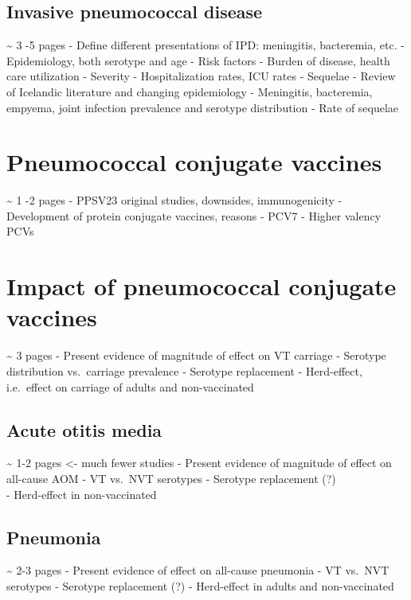 \documentclass[]{book}
\theoremstyle{definition}
\theoremstyle{definition}
\theoremstyle{definition}
\theoremstyle{remark}
\begin{document}
\subsection{Invasive pneumococcal
disease}\label{invasive-pneumococcal-disease}

\textasciitilde{} 3 -5 pages - Define different presentations of IPD:
meningitis, bacteremia, etc. - Epidemiology, both serotype and age -
Risk factors - Burden of disease, health care utilization - Severity -
Hospitalization rates, ICU rates - Sequelae - Review of Icelandic
literature and changing epidemiology - Meningitis, bacteremia, empyema,
joint infection prevalence and serotype distribution - Rate of sequelae

\section{Pneumococcal conjugate
vaccines}\label{pneumococcal-conjugate-vaccines}

\textasciitilde{} 1 -2 pages - PPSV23 original studies, downsides,
immunogenicity - Development of protein conjugate vaccines, reasons -
PCV7 - Higher valency PCVs

\section{Impact of pneumococcal conjugate
vaccines}\label{impact-of-pneumococcal-conjugate-vaccines}

\textasciitilde{} 3 pages - Present evidence of magnitude of effect on
VT carriage - Serotype distribution vs.~carriage prevalence - Serotype
replacement - Herd-effect, i.e.~effect on carriage of adults and
non-vaccinated

\subsection{Acute otitis media}\label{acute-otitis-media-1}

\textasciitilde{} 1-2 pages \textless{}- much fewer studies - Present
evidence of magnitude of effect on all-cause AOM - VT vs.~NVT serotypes
- Serotype replacement (?)\\
- Herd-effect in non-vaccinated

\subsection{Pneumonia}\label{pneumonia-1}

\textasciitilde{} 2-3 pages - Present evidence of effect on all-cause
pneumonia - VT vs.~NVT serotypes - Serotype replacement (?) -
Herd-effect in adults and non-vaccinated
\end{document}
